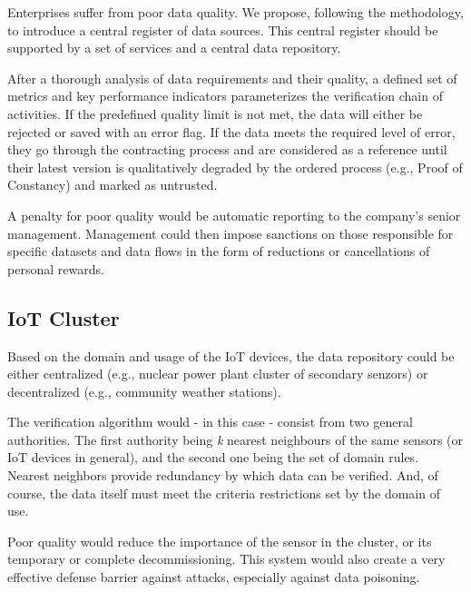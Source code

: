 Enterprises suffer from poor data quality.
We propose, following the methodology, to introduce a central register of data sources.
This central register should be supported by a set of services and a central data repository.

After a thorough analysis of data requirements and their quality, a defined set of metrics and key performance indicators parameterizes the verification chain of activities.
If the predefined quality limit is not met, the data will either be rejected or saved with an error flag.
If the data meets the required level of error, they go through the contracting process and are considered as a reference until their latest version is qualitatively degraded by the ordered process (e.g., Proof of Constancy) and marked as untrusted.

A penalty for poor quality would be automatic reporting to the company's senior management.
Management could then impose sanctions on those responsible for specific datasets and data flows in the form of reductions or cancellations of personal rewards.

\subsection{IoT Cluster}

Based on the domain and usage of the IoT devices, the data repository could be either centralized (e.g., nuclear power plant cluster of secondary senzors) or decentralized (e.g., community weather stations).

The verification algorithm would - in this case - consist from two general authorities.
The first authority being \textit{k} nearest neighbours of the same sensors (or IoT devices in general), and the second one being the set of domain rules.
Nearest neighbors provide redundancy by which data can be verified.
And, of course, the data itself must meet the criteria restrictions set by the domain of use.

Poor quality would reduce the importance of the sensor in the cluster, or its temporary or complete decommissioning.
This system would also create a very effective defense barrier against attacks, especially against data poisoning.

